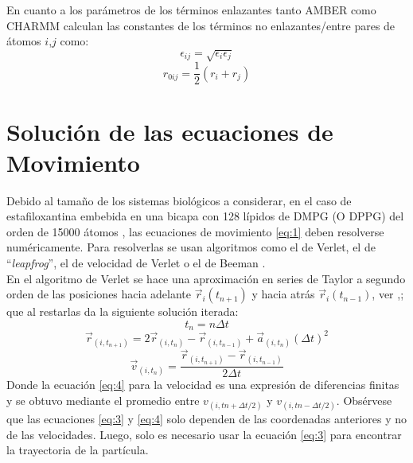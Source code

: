 En cuanto a los par\'{a}metros de los t\'{e}rminos enlazantes tanto AMBER como CHARMM calculan las constantes de los t\'{e}rminos no enlazantes/entre pares de \'{a}tomos $i$,$j$ como:
\begin{equation}\label{eq:6}
   \epsilon_{ij}=\sqrt{\epsilon_{i}\epsilon_{j}}
\end{equation}
\begin{equation}\label{eq:7}
   r_{0ij}=\frac{1}{2}\left(r_i+r_j\right)
\end{equation}
\section{Soluci\'{o}n de las ecuaciones de Movimiento}
Debido al tama\~no de los sistemas biol\'{o}gicos a considerar, en el caso de estafiloxantina embebida en una bicapa con 128 l\'{i}pidos de DMPG (O DPPG) del orden de 15000 \'{a}tomos \cite{Melendez-Delgado2018StudyingBilayers}, las ecuaciones de movimiento \eqref{eq:1} deben resolverse num\'{e}ricamente. Para resolverlas se usan algoritmos como el de Verlet, el de ``\textit{leapfrog}'', el de velocidad de Verlet o el de Beeman \cite{Mazur1997CommonRevisited}.\\
En el algoritmo de Verlet se hace una aproximaci\'{o}n en series de Taylor a segundo orden de las posiciones hacia adelante $\vec{r}_{i}(t_{n+1})$ y hacia atr\'{a}s $\vec{r}_{i}(t_{n-1})$, ver \cite{Melendez-Delgado2018StudyingBilayers},\cite{Mazur1997CommonRevisited}; que al restarlas da la siguiente soluci\'{o}n iterada:
\begin{equation}\label{eq:8}
t_{n}=n\Delta t
\end{equation}
\begin{equation}\label{eq:9}
\vec{r}_{(i,t_{n+1})}=2\vec{r}_{(i,t_{n})}-\vec{r}_{(i,t_{n-1})}+\vec{a}_{(i,t_{n})}(\Delta t)^2
\end{equation}
\begin{equation}\label{eq:10}
\vec{v}_{(i,t_{n})}=\frac{\vec{r}_{(i,t_{n+1})}-\vec{r}_{(i,t_{n-1})}}{2\Delta t}
\end{equation}
Donde la ecuaci\'{o}n \eqref{eq:4} para la velocidad es una expresi\'{o}n de diferencias finitas y se obtuvo mediante el promedio entre $v_{(i,tn+\Delta t/2)}$ y $v_{(i,tn-\Delta t/2)}$.
Obs\'{e}rvese que las ecuaciones \eqref{eq:3} y \eqref{eq:4} solo dependen de las coordenadas anteriores y no de las velocidades. Luego, solo es necesario usar la ecuaci\'{o}n \eqref{eq:3} para encontrar la trayectoria de la part\'{i}cula.\\

